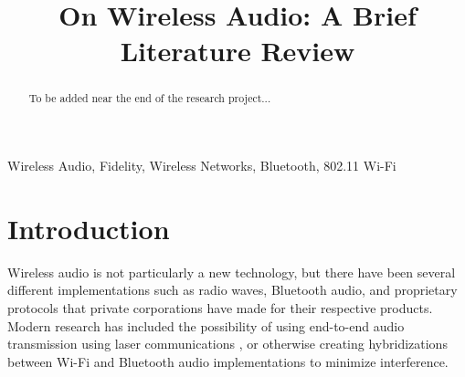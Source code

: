 \documentclass[conference]{IEEEtran}
\begin{document}
\title{On Wireless Audio: A Brief Literature Review}

\author{
    \and
    \and
}

\maketitle


\begin{abstract}
    To be added near the end of the research project...
\end{abstract}

\begin{IEEEkeywords}
    Wireless Audio, Fidelity, Wireless Networks, Bluetooth, 802.11 Wi-Fi
\end{IEEEkeywords}

\section*{Introduction}
Wireless audio is not particularly a new technology, but there have been several different
implementations such as radio waves, Bluetooth audio, and proprietary protocols that
private corporations have made for their respective products.\cite{bhalla_unraveling_2021}
Modern research has included the possibility of using end-to-end audio transmission using laser communications \cite{anthony_approach_2021}, or otherwise creating hybridizations between Wi-Fi and Bluetooth audio implementations to minimize interference.\cite{forenbacher_throughput_2021}
\end{document}
